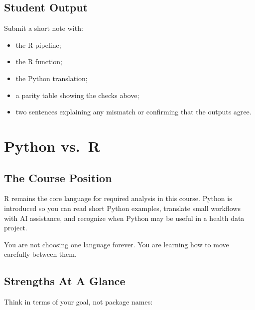\documentclass[
  letterpaper,
  DIV=11,
  numbers=noendperiod,
  oneside]{scrreprt}
\providecommand{\tightlist}{%
  \setlength{\itemsep}{0pt}\setlength{\parskip}{0pt}}
\begin{document}
\section{Student Output}\label{student-output}

Submit a short note with:

\begin{itemize}
\tightlist
\item
  the R pipeline;
\item
  the R function;
\item
  the Python translation;
\item
  a parity table showing the checks above;
\item
  two sentences explaining any mismatch or confirming that the outputs
  agree.
\end{itemize}

\chapter{Python vs.~R}\label{python-vs.-r}

\section{The Course Position}\label{the-course-position}

R remains the core language for required analysis in this course. Python
is introduced so you can read short Python examples, translate small
workflows with AI assistance, and recognize when Python may be useful in
a health data project.

You are not choosing one language forever. You are learning how to move
carefully between them.

\section{Strengths At A Glance}\label{strengths-at-a-glance}

Think in terms of your goal, not package names:
\end{document}
